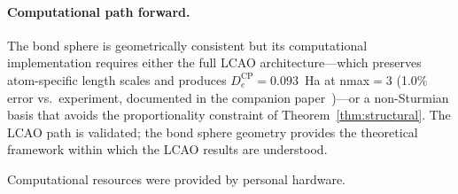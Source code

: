 \documentclass[aps,pra,twocolumn,superscriptaddress,longbibliography]{revtex4-2}
\begin{document}
\paragraph{Computational path forward.}
The bond sphere is geometrically consistent but its computational
implementation requires either the full LCAO architecture---which
preserves atom-specific length scales and produces $D_e^{\text{CP}}
= 0.093$~Ha at nmax$= 3$ (1.0\% error vs.\ experiment, documented in
the companion paper~\cite{loutey_fci})---or a non-Sturmian basis that
avoids the proportionality constraint of Theorem~\ref{thm:structural}.
The LCAO path is validated; the bond sphere geometry provides the
theoretical framework within which the LCAO results are understood.


\begin{acknowledgments}
Computational resources were provided by personal hardware.
\end{acknowledgments}
\end{document}
